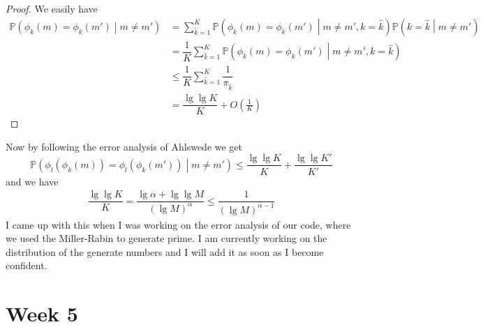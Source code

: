 \documentclass{article}
\begin{document}
\begin{proof}
	We easily have 
	\begin{align*}
		\mathbb{P}\left(  \phi_k(m) = \phi_k(m') \middle| m \neq  m'  \right) &= \sum_{\hat{k} = 1}^K \mathbb{P}\left(  \phi_k(m) = \phi_k(m') \middle| m \neq m', k = \hat{k}   \right) \mathbb{P}\left( k = \hat{k} \middle| m \neq m'  \right) \\
		&= \dfrac{1}{K} \sum_{\hat{k} = 1}^K \mathbb{P}\left(  \phi_k(m) = \phi_k(m')\middle| m \neq m', k = \hat{k}   \right) \\
		&\leq \dfrac{1}{K} \sum_{\hat{k} = 1}^K  \dfrac{1}{\pi_{\hat{k}}} \\
		&= \dfrac{\lg \lg K}{K} + O(\frac{1}{K})
	\end{align*}
\end{proof}
Now by following the error analysis of Ahlswede we get 
\begin{equation*}
	\mathbb{P}\left( \phi_l(\phi_k(m)) = \phi_l(\phi_k(m'))\middle| m \neq m'  \right) \leq \dfrac{\lg \lg K}{K} + \dfrac{\lg \lg K'}{K'}
\end{equation*}
and we have 
\begin{align*}
	\dfrac{\lg \lg K}{K} = \dfrac{\lg \alpha + \lg \lg M}{(\lg M)^{\alpha}} \leq \dfrac{1}{(\lg M)^{\alpha - 1}}
\end{align*}
I came up with this when I was working on the error analysis of our code, where we used the Miller-Rabin to generate prime. I am currently working on the distribution of the generate numbers and I will add it as soon as I become confident.

\section{Week 5}
\end{document}
